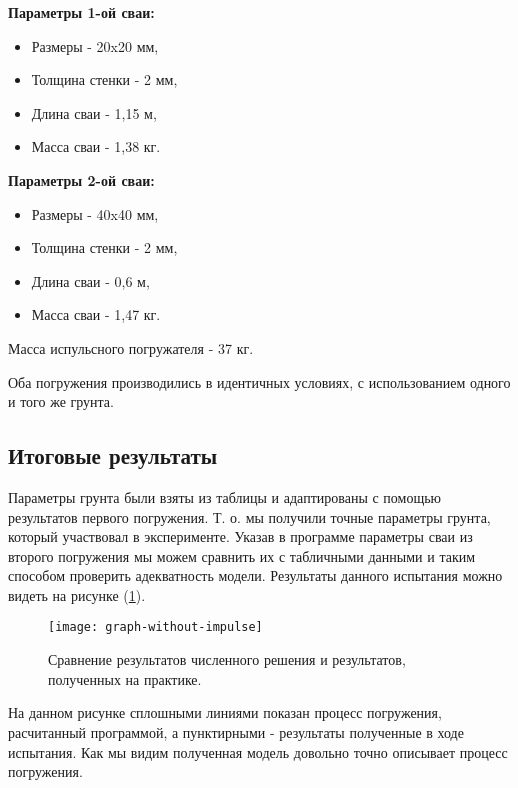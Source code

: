 \vspace{1em}

\begin{minipage}{0.5\textwidth}
    \textbf{Параметры 1-ой сваи:}
    \begin{itemize}
        \item Размеры - 20x20 мм,
        \item Толщина стенки - 2 мм,
        \item Длина сваи - 1,15 м,
        \item Масса сваи - 1,38 кг.
    \end{itemize}
\end{minipage}
\hfill
\begin{minipage}{0.5\textwidth}
    \textbf{Параметры 2-ой сваи:}
    \begin{itemize}
        \item Размеры - 40x40 мм,
        \item Толщина стенки - 2 мм,
        \item Длина сваи - 0,6 м,
        \item Масса сваи - 1,47 кг.
    \end{itemize}
\end{minipage}

\noindent Масса испульсного погружателя - 37 кг.

Оба погружения производились в идентичных условиях, с использованием одного и того же грунта.

\subsection{Итоговые результаты}

Параметры грунта были взяты из таблицы и адаптированы с помощью результатов первого погружения. Т. о.
мы получили точные параметры грунта, который участвовал в эксперименте. Указав в программе параметры сваи
из второго погружения мы можем сравнить их с табличными данными и таким способом проверить адекватность
модели. Результаты данного испытания можно видеть на рисунке (\ref{fig:graph-without-impulse}).

\begin{figure}[ht]
    \centering
    \texttt{[image: graph-without-impulse]}
    \caption{Сравнение результатов численного решения и результатов, полученных на практике.}
    \label{fig:graph-without-impulse}
\end{figure}

На данном рисунке сплошными линиями показан процесс погружения, расчитанный программой,
а пунктирными - результаты полученные в ходе испытания. Как мы видим полученная модель довольно
точно описывает процесс погружения.

